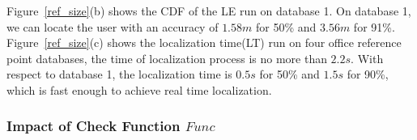 Figure~\ref{ref_size}(b) shows the CDF of the LE run on database 1. On database 1, we can locate the user with an accuracy of $1.58m$ for 50\% and  $3.56m$ for 91\%. Figure~\ref{ref_size}(c) shows the localization time(LT) run on four office reference point databases, the time of localization process is no more than $2.2s$. With respect to database 1, the localization time is $0.5s$ for 50\% and $1.5s$ for 90\%, which is fast enough to achieve real time localization.

%
\subsubsection{Impact of Check Function $Func$}

